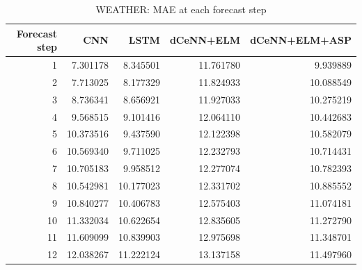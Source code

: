 \begin{table}
\caption{WEATHER: MAE at each forecast step}
\begin{tabular}{rrrrr}
\toprule
Forecast step & CNN & LSTM & dCeNN+ELM & dCeNN+ELM+ASP \\
\midrule
1 & 7.301178 & 8.345501 & 11.761780 & 9.939889 \\
2 & 7.713025 & 8.177329 & 11.824933 & 10.088549 \\
3 & 8.736341 & 8.656921 & 11.927033 & 10.275219 \\
4 & 9.568515 & 9.101416 & 12.064110 & 10.442683 \\
5 & 10.373516 & 9.437590 & 12.122398 & 10.582079 \\
6 & 10.569340 & 9.711025 & 12.232793 & 10.714431 \\
7 & 10.705183 & 9.958512 & 12.277074 & 10.782393 \\
8 & 10.542981 & 10.177023 & 12.331702 & 10.885552 \\
9 & 10.840277 & 10.406783 & 12.575403 & 11.074181 \\
10 & 11.332034 & 10.622654 & 12.835605 & 11.272790 \\
11 & 11.609099 & 10.839903 & 12.975698 & 11.348701 \\
12 & 12.038267 & 11.222124 & 13.137158 & 11.497960 \\
\bottomrule
\end{tabular}
\end{table}
